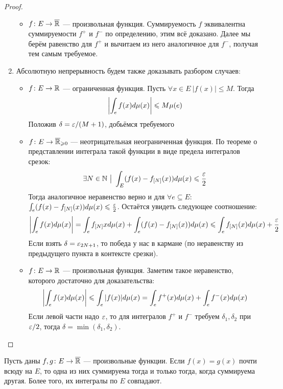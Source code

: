 \begin{proof}
\begin{enumerate}
\begin{itemize}
			\item $f \colon E \to \overline{\mathbb{R}}$ --- произвольная функция. Суммируемость $f$ эквивалентна суммируемости $f^+$ и $f^-$ по определению, этим всё доказано. Далее мы берём равенство для $f^+$ и вычитаем из него аналогичное для $f^-$, получая тем самым требуемое.
		\end{itemize}
	
		\item Абсолютную непрерывность будем также доказывать разбором случаев:
		\begin{itemize}
			\item $f \colon E \to \mathbb{R}$ --- ограниченная функция. Пусть $\forall x \in E\ |f(x)| \le M$. Тогда
			\[
				\left|\int_e f(x)d\mu(x)\right| \leqslant M\mu(e)
			\]
			Положив $\delta = \varepsilon / (M + 1)$, добьёмся требуемого
			
			\item $f \colon E \to \overline{\mathbb{R}}_{\geqslant 0}$ --- неотрицательная неограниченная функция. По теореме о представлении интеграла такой функции в виде предела интегралов срезок:
			\[
				\exists N \in \mathbb{N} \ \big|\  \int_E (f(x) - f_{[N]}(x))d\mu(x) \leqslant \frac{\varepsilon}{2}
			\]
			Тогда аналогичное неравенство верно и для $\forall e \subseteq E$: $\int_e (f(x) - f_{[N]}(x))d\mu(x) \leqslant \frac{\varepsilon}{2}$. Остаётся увидеть следующее соотношение:
			\[
				\left|\int_e f(x)d\mu(x)\right| = \int_e f_{[N]}xd\mu(x) + \int_e (f(x) - f_{[N]}(x))d\mu(x) \leqslant \int_e f_{[N]}(x)d\mu(x) + \frac{\varepsilon}{2}
			\]
			Если взять $\delta = \varepsilon_{2N + 1}$, то победа у нас в кармане (по неравенству из предыдущего пункта в контексте срезки).
			
			\item $f \colon E \to \mathbb{R}$ --- произвольная функция. Заметим такое неравенство, которого достаточно для доказательства:
			\[
				\left|\int_e f(x)d\mu(x)\right| \leqslant \int_e |f(x)|d\mu(x) = \int_e f^+(x)d\mu(x) + \int_e f^-(x)d\mu(x)
			\]
			Если левой части надо $\varepsilon$, то для интегралов $f^+$ и $f^-$ требуем $\delta_1, \delta_2$ при $\varepsilon / 2$, тогда $\delta = \min(\delta_1, \delta_2)$.
		\end{itemize}
	\end{enumerate}
\end{proof}

\begin{corollary}
	Пусть даны $f, g \colon E \to \overline{\mathbb{R}}$ --- произвольные функции. Если $f(x) = g(x)$ почти всюду на $E$, то одна из них суммируема тогда и только тогда, когда суммируема другая. Более того, их интегралы по $E$ совпадают.
\end{corollary}

